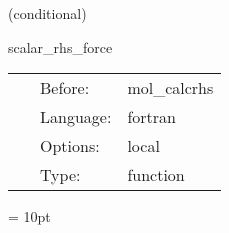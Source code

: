    (conditional) 

\hspace{5mm} scalar\_rhs\_force 

\hspace{5mm}{\it writes external force grid function } 


\hspace{5mm}

 \begin{tabular*}{160mm}{cll} 
~ & Before:  & mol\_calcrhs \\ 
~ & Language:  & fortran \\ 
~ & Options:  & local \\ 
~ & Type:  & function \\ 
\end{tabular*} 



\vspace{5mm}\parskip = 10pt 
